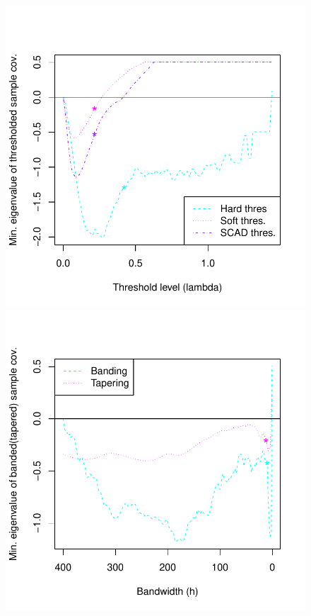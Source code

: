 \documentclass[times,sort&compress,3p]{elsarticle}
\begin{document}
\begin{figure}[htb!]
\centering
\begin{minipage}{.45\textwidth}
  \centering
  \includegraphics[width=1.0\linewidth]{thresholding_mineigval.pdf}
\end{minipage}%
\begin{minipage}{.45\textwidth}
  \centering
 \includegraphics[width=1.0\linewidth]{banding_mineigval.pdf}

\end{minipage}
\end{figure}
\end{document}
